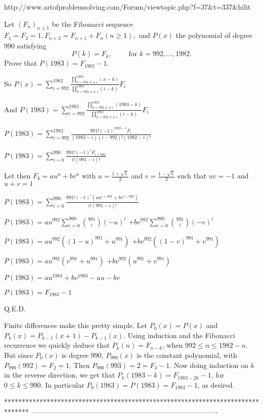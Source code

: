 \begin{solution}
	http://www.artofproblemsolving.com/Forum/viewtopic.php?f=37&t=337&hilit
\end{solution}



\begin{solution}
	\begin{tcolorbox}Let $(F_n)_{n\geq 1} $ be the Fibonacci sequence $F_1 = F_2 = 1, F_{n+2} = F_{n+1} + F_n (n \geq 1),$ and $P(x)$ the polynomial of degree $990$ satisfying
\[ P(k) = F_k, \qquad \text{ for } k = 992, . . . , 1982.\]
Prove that $P(1983) = F_{1983} - 1.$\end{tcolorbox}

So $P(x)=\sum_{i=992}^{1982}\frac{\prod_{k=992,k\ne i}^{1982}(x-k)}{\prod_{k=992,k\ne i}^{1982}(i-k)}F_i$

And $P(1983)=\sum_{i=992}^{1982}\frac{\prod_{k=992,k\ne i}^{1982}(1983-k)}{\prod_{k=992,k\ne i}^{1982}(i-k)}F_i$

$P(1983)=\sum_{i=992}^{1982}\frac{991!(-1)^{1982-i}F_i}{(1983-i)(i-992)!(1982-i)!}$

$P(1983)=\sum_{i=0}^{990}\frac{991!(-1)^{i}F_{i+992}}{i!(991-i)!}$

Let then $F_k=au^n+bv^n$ with $u=\frac{1+\sqrt 5}2$ and $v=\frac{1-\sqrt 5}2$ such that $uv=-1$ and $u+v=1$

$P(1983)=\sum_{i=0}^{990}\frac{991!(-1)^{i}(au^{i+992}+bv^{i+992})}{i!(991-i)!}$

$P(1983)=au^{992}\sum_{i=0}^{990}\binom{991}{i}(-u)^i$ $+bv^{992}\sum_{i=0}^{990}\binom{991}{i}(-v)^i$

$P(1983)=au^{992}((1-u)^{991}+u^{991})$ $+bv^{992}((1-v)^{991}+v^{991})$ 

$P(1983)=au^{992}(v^{991}+u^{991})$ $+bv^{992}(u^{991}+v^{991})$ 

$P(1983)=au^{1983}+bv^{1983}-au-bv$

$\boxed{P(1983)=F_{1983}-1}$

Q.E.D.
\end{solution}



\begin{solution}
	Finite differences make this pretty simple. Let $P_0(x) = P(x)$ and $P_k(x) = P_{k-1}(x+1) - P_{k-1}(x)$. Using induction and the Fibonacci recurrence we quickly deduce that $P_k(n) = F_{n-k}$, when $992 \leq n \leq 1982 - n$. But since $P_0(x)$ is degree $990$, $P_{990}(x)$ is the constant polynomial, with $P_{990}(992) = F_2 = 1$. Then $P_{990}(993) = 2 = F_3 - 1$. Now doing induction on $k$ in the reverse direction, we get that $P_k(1983-k) = F_{1983-2k} - 1$, for $0 \leq k \leq 990$. In particular $P_0(1983) = P(1983) = F_{1983} - 1$, as desired.
\end{solution}
*******************************************************************************
-------------------------------------------------------------------------------

